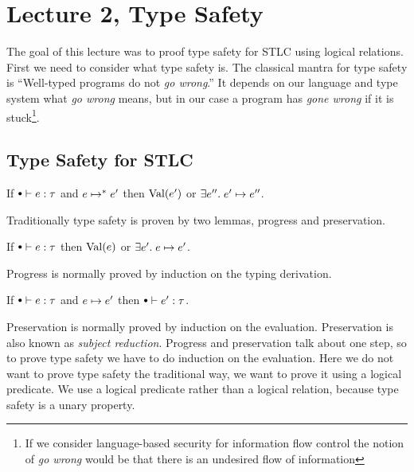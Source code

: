 \section*{Lecture 2, Type Safety}
The goal of this lecture was to proof type safety for STLC using logical relations. First we need to consider what type safety is. The classical mantra for type safety is ``Well-typed programs do not \emph{go wrong}.'' It depends on our language and type system what \emph{go wrong} means, but in our case a program has \emph{gone wrong} if it is stuck\footnote{If we consider language-based security for information flow control the notion of \emph{go wrong} would be that there is an undesired flow of information}. 

\subsection*{Type Safety for STLC}
\begin{stlctypesafety}
  If $\mtenv \vdash e : \tau$ and $e \mapsto^{*} e'$ then $\operatorname{Val}(e')$ or $\exists e''. \; e' \mapsto e''$.
\end{stlctypesafety}
Traditionally type safety is proven by two lemmas, progress and preservation.
\begin{progress}[Progress]
  If $\mtenv \vdash e : \tau$ then $\operatorname{Val}(e)$ or $\exists e'. \; e \mapsto e'$.
\end{progress}
Progress is normally proved by induction on the typing derivation.
\begin{preservation}[Preservation]
  If $\mtenv \vdash e : \tau$ and $e \mapsto e'$ then $\mtenv \vdash e' : \tau$.
\end{preservation}
Preservation is normally proved by induction on the evaluation.
Preservation is also known as \emph{subject reduction}. Progress and preservation talk about one step, so to prove type safety we have to do induction on the evaluation. Here we do not want to prove type safety the traditional way, we want to prove it using a logical predicate. We use a logical predicate rather than a logical relation, because type safety is a unary property.

